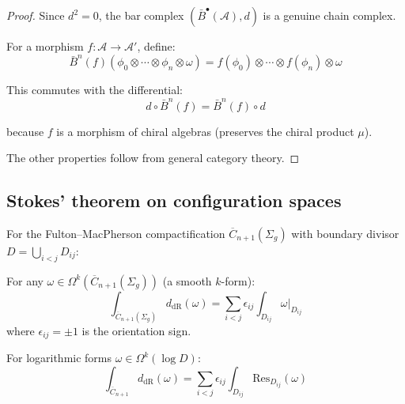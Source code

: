 \begin{proof}
Since $d^2 = 0$, the bar complex $(\bar{B}^{\bullet}(\mathcal{A}), d)$ is a genuine chain complex.

For a morphism $f: \mathcal{A} \to \mathcal{A}'$, define:
\[\bar{B}^n(f)(\phi_0 \otimes \cdots \otimes \phi_n \otimes \omega) = f(\phi_0) \otimes \cdots \otimes f(\phi_n) \otimes \omega\]

This commutes with the differential:
\[d \circ \bar{B}^n(f) = \bar{B}^n(f) \circ d\]

because $f$ is a morphism of chiral algebras (preserves the chiral product $\mu$).

The other properties follow from general category theory.
\end{proof}

\subsection{Stokes' theorem on configuration spaces}

\begin{theorem}\label{thm:stokes-config}
For the Fulton--MacPherson compactification $\overline{C}_{n+1}(\Sigma_g)$ with boundary divisor $D = \bigcup_{i<j} D_{ij}$:

For any $\omega \in \Omega^k(\overline{C}_{n+1}(\Sigma_g))$ (a smooth $k$-form):
\[\int_{\overline{C}_{n+1}(\Sigma_g)} d_{\text{dR}}(\omega) = \sum_{i<j} \epsilon_{ij} \int_{D_{ij}} \omega|_{D_{ij}}\]
where $\epsilon_{ij} = \pm 1$ is the orientation sign.

For logarithmic forms $\omega \in \Omega^k(\log D)$:
\[\int_{\overline{C}_{n+1}} d_{\text{dR}}(\omega) = \sum_{i<j} \epsilon_{ij} \int_{D_{ij}} \text{Res}_{D_{ij}}(\omega)\]
\end{theorem}

